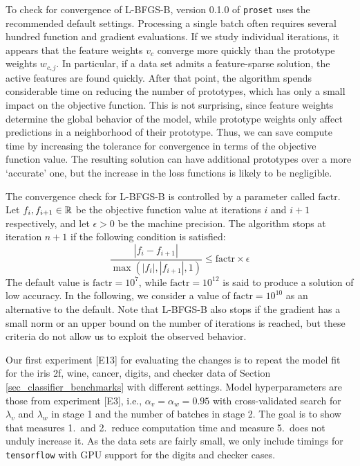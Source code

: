 %
To check for convergence of L-BFGS-B, version 0.1.0 of \texttt{proset} uses the recommended default settings.
Processing a single batch often requires several hundred function and gradient evaluations.
If we study individual iterations, it appears that the feature weights $v_c$ converge more quickly than the prototype weights $w_{c,j}$.
In particular, if a data set admits a feature-sparse solution, the active features are found quickly.
After that point, the algorithm spends considerable time on reducing the number of prototypes, which has only a small impact on the objective function.
This is not surprising, since feature weights determine the global behavior of the model, while prototype weights only affect predictions in a neighborhood of their prototype.
Thus, we can save compute time by increasing the tolerance for convergence in terms of the objective function value.
The resulting solution can have additional prototypes over a more `accurate' one, but the increase in the loss functions is likely to be negligible.\par
%
The convergence check for L-BFGS-B is controlled by a parameter called $\text{factr}$.
Let $f_i,f_{i+1}\in\mathbb{R}$ be the objective function value at iterations $i$ and $i+1$ respectively, and let $\epsilon>0$ be the machine precision.
The algorithm stops at iteration $n+1$ if the following condition is satisfied:
%
\begin{equation}
\frac{|f_{i}-f_{i+1}|}{\max(|f_{i}|,|f_{i+1}|,1)}\leq\text{factr}\times\epsilon\label{eq_l_bfgs_b_stop}
\end{equation}
%
The default value is $\text{factr}=10^7$, while $\text{factr}=10^{12}$ is said to produce a solution of low accuracy.
In the following, we consider a value of $\text{factr}=10^{10}$ as an alternative to the default.
Note that L-BFGS-B also stops if the gradient has a small norm or an upper bound on the number of iterations is reached, but these criteria do not allow us to exploit the observed behavior.\par
%
Our first experiment [E13] for evaluating the changes is to repeat the model fit for the iris 2f, wine, cancer, digits, and checker data of Section \ref{sec_classifier_benchmarks} with different settings.
Model hyperparameters are those from experiment [E3], i.e., $\alpha_v=\alpha_w=0.95$ with cross-validated search for $\lambda_v$ and $\lambda_w$ in stage 1 and the number of batches in stage 2.
The goal is to show that measures 1.\ and 2.\ reduce computation time and measure 5.\ does not unduly increase it.
As the data sets are fairly small, we only include timings for \texttt{tensorflow} with GPU support for the digits and checker cases.

